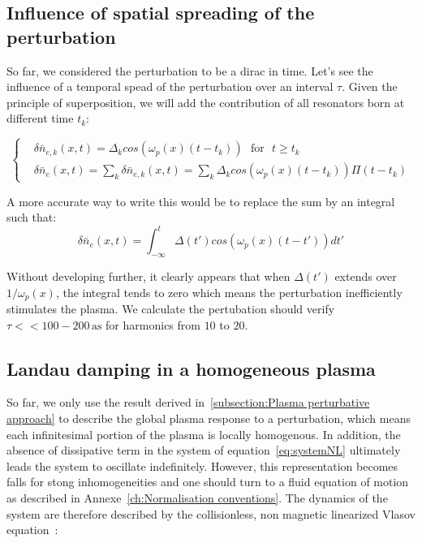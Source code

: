 \subsection{Influence of spatial spreading of the perturbation}


So far, we considered the perturbation to be a dirac in time. Let's see the influence of a temporal spead of the perturbation over an interval $\tau$. 
Given the principle of superposition, we will add the contribution of all resonators born at different time $t_k$: 


\begin{equation}
  \left\{
      \begin{aligned}
&\delta\bar{n}_{e,k}(x,t) = \Delta_k cos(\omega_p(x) (t-t_k)) \ \ \  \mbox{for} \ \ \  t \ge t_k\\
&\delta \bar{n}_e(x,t) =\sum_{k}\delta\bar{n}_{e,k}(x,t) = \sum_{k}\Delta_k cos(\omega_p(x) (t-t_k))\Pi(t-t_k) 
      \end{aligned}
    \right.
\label{eq:SeveralResonnator}
\end{equation}

\noindent A more accurate way to write this would be to replace the sum by an integral such that:
\begin{equation}
\delta \bar{n}_e(x,t) =\int_{-\infty}^t\Delta(t') cos(\omega_p(x) (t-t'))dt' 
\end{equation}

\noindent Without developing further, it clearly appears that when $\Delta (t')$ extends over $1/\omega_p(x)$, the integral tends to zero which means the perturbation inefficiently stimulates the plasma. We calculate the pertubation should verify $\tau << 100-200\,\mathrm{as}$ for harmonics from $10$ to $20$. 

\subsection{Landau damping in a homogeneous plasma}\label{Landau damping in an inhomogeneous plasma}

So far, we only use the result derived in~\ref{subsection:Plasma perturbative approach} to describe the global plasma response to a perturbation, which means each infinitesimal portion of the plasma is locally homogenous. In addition, the absence of dissipative term in the system of equation~\ref{eq:systemNL} ultimately leads the system to oscillate indefinitely. However, this representation becomes falls for stong inhomogeneities and one should turn to a fluid equation of motion \cite{mora2011introduction} as described in Annexe~\ref{ch:Normalisation conventions}. The dynamics of the system are therefore described by the collisionless, non magnetic linearized Vlasov equation~\cite{vlasov1945theory}:

